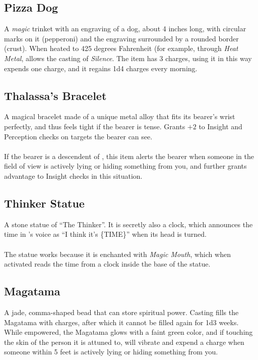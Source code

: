 \subsection{Pizza Dog}
\label{items:pizzadog}
A \textit{magic} trinket with an engraving of a dog, about 4 inches long, with circular marks on it (pepperoni) and the engraving surrounded by a rounded border (crust). When heated to 425 degrees Fahrenheit (for example, through \textit{Heat Metal}, allows the casting of \textit{Silence}. The item has 3 charges, using it in this way expends one charge, and it regains 1d4 charges every morning.


\subsection{Thalassa's Bracelet}
\label{items:bracelet}
A magical bracelet made of a unique metal alloy that fits its bearer's wrist perfectly, and thus feels tight if the bearer is tense. Grants $+2$ to Insight and Perception checks on targets the bearer can see.\\
\\
If the bearer is a descendent of , this item alerts the bearer when someone in the field of view is actively lying or hiding something from you, and further grants advantage to Insight checks in this situation.

\subsection{Thinker Statue}
\label{items:thinker}
A stone statue of ``The Thinker''. It is secretly also a clock, which announces the time in 's voice as ``I think it's \{TIME\}'' when its head is turned. \\
\\
The statue works because it is enchanted with \textit{Magic Mouth}, which when activated reads the time from a clock inside the base of the statue.

\subsection{Magatama}
\label{items:magatama}
A jade, comma-shaped bead that can store spiritual power. Casting  fills the Magatama with charges, after which it cannot be filled again for 1d3 weeks. While empowered, the Magatama glows with a faint green color, and if touching the skin of the person it is attuned to, will vibrate and expend a charge when someone within 5 feet is actively lying or hiding something from you.